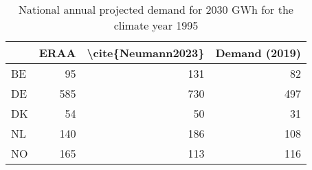 \begin{table}
\centering
\caption{National annual projected demand for 2030  GWh for the climate year 1995}
\begin{tabular}{lrrr}
\toprule
{} &  ERAA &  \textbackslash cite\{Neumann2023\} &  Demand (2019) \\
\midrule
BE &    95 &                 131 &             82 \\
DE &   585 &                 730 &            497 \\
DK &    54 &                  50 &             31 \\
NL &   140 &                 186 &            108 \\
NO &   165 &                 113 &            116 \\
\bottomrule
\end{tabular}
\end{table}
